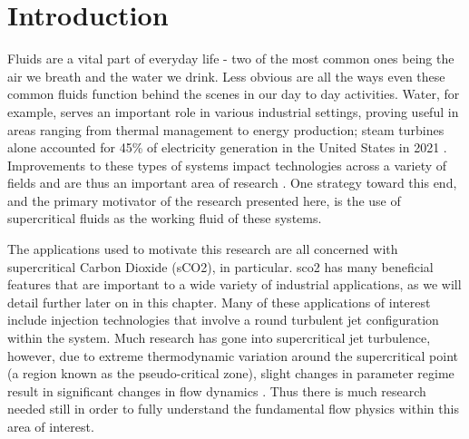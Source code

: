 \chapter{Introduction}


Fluids are a vital part of everyday life - two of the most common ones being the air we breath and the water we drink. Less obvious are all the ways even these common fluids function behind the scenes in our day to day activities. Water, for example, serves an important role in various industrial settings, proving useful in areas ranging from thermal management to energy production; steam turbines alone accounted for 45\% of electricity generation in the United States in 2021 \cite{US_elec_gen_stat}. Improvements to these types of systems impact technologies across a variety of fields and are thus an important area of research \cite{}. One strategy toward this end, and the primary motivator of the research presented here, is the use of supercritical fluids as the working fluid of these systems. 

The applications used to motivate this research are all concerned with supercritical Carbon Dioxide (sCO2), in particular. \gls{sco2} has many beneficial features that are important to a wide variety of industrial applications, as we will detail further later on in this chapter. Many of these applications of interest include injection technologies that involve a round turbulent jet configuration within the system. Much research has gone into supercritical jet turbulence, however, due to extreme thermodynamic variation around the supercritical point (a region known as the pseudo-critical zone), slight changes in parameter regime result in significant changes in flow dynamics \cite{}. Thus there is much research needed still in order to fully understand the fundamental flow physics within this area of interest. 

